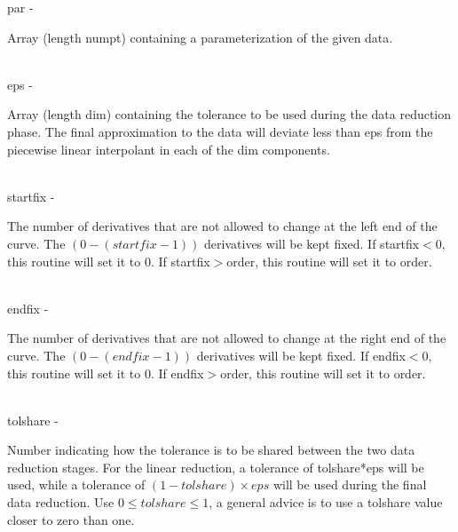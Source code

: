         \>\>    {\fov par}      \> - \> \begin{minipg2}
                                Array (length numpt) containing a
                                parameterization of the given data.
                                \end{minipg2}\\[0.3ex]
        \>\>    {\fov eps}      \> - \> \begin{minipg2}
                                Array (length dim) containing the tolerance to be
                                used during the data reduction phase. The final
                                approximation to the data will deviate less than
                                eps from the piecewise linear interpolant in each
                                of the dim components.
                                \end{minipg2}\\[0.3ex]
        \>\>    {\fov startfix}\> - \>  \begin{minipg2}
                                The number of derivatives that are not allowed to
                                change at the left end of the curve.
                                The $(0 - (startfix -1))$
                                derivatives will be kept fixed. If startfix$<$0, this
                                routine will set it to 0. If startfix$>$order,
                                this routine will set it to order.
                                \end{minipg2}\\[0.8ex]
        \>\>    {\fov endfix}   \> - \> \begin{minipg2}
                                The number of derivatives that are not allowed to
                                change at the right end of the curve.
                                The $(0 - (endfix-1))$ derivatives will
                                be kept fixed.
                                If endfix$<$0, this routine will set it to 0.
                                If endfix$>$order, this routine will
                                set it to order.
                                \end{minipg2}\\[0.8ex]
        \>\>    {\fov tolshare}\> - \>  \begin{minipg2}
                                Number indicating how the tolerance is to be
                                shared between the two data reduction stages. For
                                the linear reduction, a tolerance of tolshare*eps will
                                be used, while a tolerance of
                                $(1-tolshare)\times eps$ will be
                                used during the final data reduction.
                                Use $0\leq tolshare\leq 1$, a general
                                advice is to use a {\fov tolshare} value
                                closer to zero than one.
                                \end{minipg2}\\[0.3ex]
